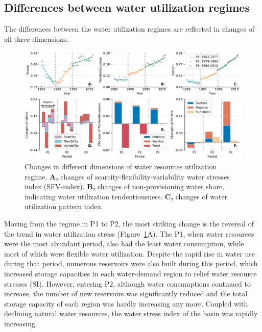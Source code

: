 \documentclass[9pt, twocolumn, twoside, lineno]{pnas-new}
\begin{document}
\subsection*{Differences between water utilization regimes}
The differences between the water utilization regimes are reflected in changes of all three dimensions.
\begin{figure}%
	\centering
	\includegraphics[width=\linewidth]{../../figures/main_text/dimensions.pdf}
	\caption{
		Changes in different dimensions of water resources utilization regime.
		\textbf{A,} changes of scarcity-flexibility-variability water stresses index (SFV-index).
		\textbf{B,} changes of non-provisioning water share, indicating water utilization tendentiousness.
		\textbf{C,} changes of water utilization pattern index.
		}
	\label{fig:dimensions}
\end{figure}
Moving from the regime in P1 to P2, the most striking change is the reversal of the trend in water utilization stress (Figure~\ref{fig:dimensions}A).
The P1, when water resources were the most abundant period, also had the least water consumption, 
while most of which were flexible water utilization.
Despite the rapid rise in water use during that period, numerous reservoirs were also built during this period, which increased storage capacities in each water-demand region to relief water resource stresses (SI).
However, entering P2, although water consumptions continued to increase, 
the number of new reservoirs was significantly reduced and the total storage capacity of each region was hardly increasing any more. 
Coupled with declining natural water resources, the water stress index of the basin was rapidly increasing.
\end{document}
